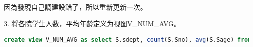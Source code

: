 \documentclass[12pt, a4paper]{report}
\begin{document}
\begin{figure}[H] %
    \centering %
\end{figure}

{因為發現自己調建設錯了，所以重新更新一次。}

\begin{figure}[H] %
    \centering %
\end{figure}

3. 将各院学生人数，平均年龄定义为视图V\_NUM\_AVG。\\

\begin{lstlisting}[language=SQL]
    create view V_NUM_AVG as select S.sdept, count(S.Sno), avg(S.Sage) from S group by S.sdept;
\end{lstlisting}

\begin{figure}[H] %
    \centering %
\end{figure}
\end{document}
